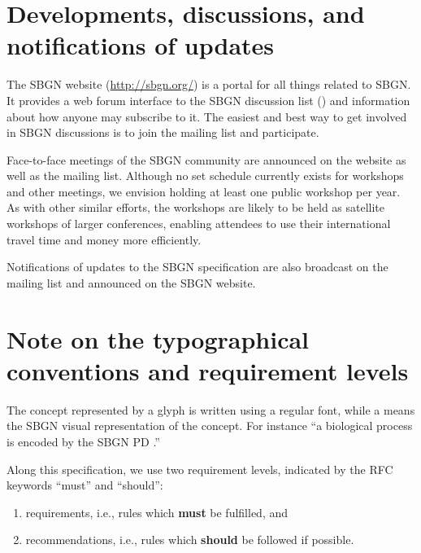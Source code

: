 \section{Developments, discussions, and notifications of updates}
\label{sec:discussions}

The SBGN website (\url{http://sbgn.org/}) is a portal for all things 
related to SBGN.  It provides a web forum interface to the SBGN discussion 
list () and information about how anyone 
may subscribe to it.  The easiest and best way to get involved in SBGN 
discussions is to join the mailing list and participate.

Face-to-face meetings of the SBGN community are announced on the website as 
well as the mailing list.  Although no set schedule currently exists for 
workshops and other meetings, we envision holding at least one public 
workshop per year.  As with other similar efforts, the workshops are likely 
to be held as satellite workshops of larger conferences, enabling attendees 
to use their international travel time and money more efficiently.

Notifications of updates to the SBGN specification are also broadcast on 
the mailing list and announced on the SBGN website.

\section{Note on the typographical conventions and requirement levels}
The concept represented by a glyph is written using a regular font, while a 
 means the SBGN visual representation of the concept. For 
instance ``a biological process is encoded by the SBGN PD .''

Along this specification, we use two requirement levels, indicated by the RFC keywords ``must'' and ``should'':
\begin{enumerate}
  \item requirements, i.e., rules which \textbf{must} be fulfilled, and
  \item recommendations, i.e., rules which \textbf{should} be followed if
  possible. 
\end{enumerate}